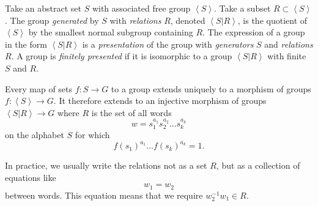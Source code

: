 Take an abstract set \(S\) with associated free group \(\left<S\right>\).
Take a subset \(R \subset \left<S\right>\).
The group \emph{generated} by \(S\) with \emph{relations} \(R\), denoted \(\left<S|R\right>\), is the quotient of \(\left<S\right>\) by the smallest normal subgroup containing \(R\).
The expression of a group in the form \(\left<S|R\right>\) is a \emph{presentation} of the group with \emph{generators} \(S\) and \emph{relations} \(R\).
A group is \emph{finitely presented} if it is isomorphic to a group \(\left<S|R\right>\) with finite \(S\) and \(R\).
\begin{lemma}
Every map of sets \(f \colon S \to G\) to a group extends uniquely to a morphism of groups \(f \colon \left<S\right> \to G\).
It therefore extends to an injective morphism of groups \(\left<S|R\right> \to G\) where \(R\) is the set of all words 
\[
w=s_1^{a_1} s_2^{a_2} \dots s_k^{a_k}
\]
on the alphabet \(S\) for which
\[
f(s_1)^{a_1} \dots f(s_k)^{a_k} = 1.
\]
\end{lemma}
In practice, we usually write the relations not as a set \(R\), but as a collection of equations like
\[
w_1 = w_2
\]
between words.
This equation means that we require \(w_2^{-1} w_1 \in R\).
